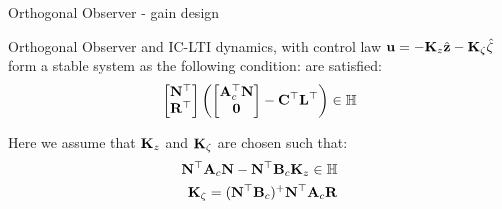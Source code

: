 \documentclass{beamer}
\begin{document}
\begin{frame}{Orthogonal Observer - gain design}
	\begin{flushleft}
		
		\begin{Theorem}
			\label{SeparationPrinciple}
			Orthogonal Observer and IC-LTI dynamics, with control law $\mathbf{u} = -\mathbf{K}_z \hat{\mathbf{z}} - \mathbf{K}_\zeta \hat{\zeta}$ form a stable system as the following condition: are satisfied:
			\begin{equation}
				\label{e_Observer_stability}
				\begin{bmatrix}
					\mathbf{N}^\top \\ \mathbf{R}^\top
				\end{bmatrix}
				\left(
				\begin{bmatrix}\mathbf{A}_c^\top\mathbf{N} \\ \mathbf{0}
				\end{bmatrix}
				- 
				\mathbf{C}^\top \mathbf{L}^\top
				\right)
				\in \mathbb{H}
			\end{equation}
		\end{Theorem}
	
		Here we assume that $\mathbf{K}_z$ and $\mathbf{K}_\zeta$ are chosen such that:
		\begin{align}
			\mathbf{N}^\top\mathbf{A}_c\mathbf{N} - \mathbf{N}^\top\mathbf{B}_c\mathbf{K}_z \in \mathbb{H} \\
			\mathbf{K}_\zeta = (\mathbf{N}^\top\mathbf{B}_c)^+\mathbf{N}^\top\mathbf{A}_c\mathbf{R}
		\end{align}
		
		
	\end{flushleft}
\end{frame}
\end{document}
